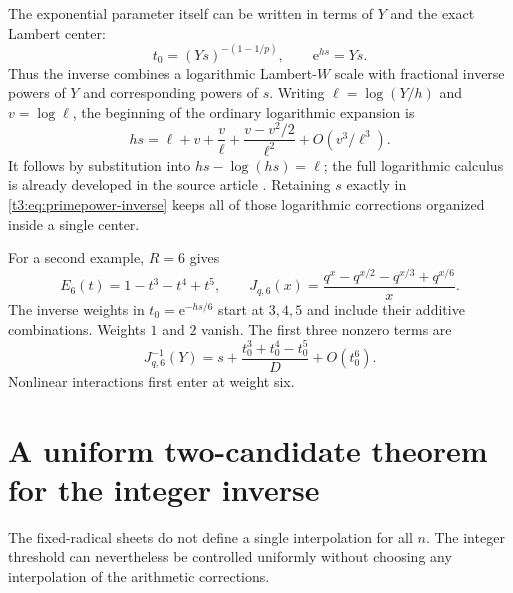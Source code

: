 \documentclass[11pt,openany]{book}
\numberwithin{equation}{chapter}
\theoremstyle{plain}
\theoremstyle{definition}
\theoremstyle{remark}
\newcommand{\ee}{\mathrm e}
\begin{document}
The exponential parameter itself can be written in terms of $Y$ and the exact Lambert center:
\begin{equation}\label{t3:eq:primepower-scale}
 t_0=(Ys)^{-(1-1/p)},\qquad \ee^{hs}=Ys.
\end{equation}
Thus the inverse combines a logarithmic Lambert-$W$ scale with fractional inverse powers of $Y$ and corresponding powers of $s$. Writing
$\ell=\log(Y/h)$ and $v=\log\ell$, the beginning of the ordinary logarithmic expansion is
\begin{equation}\label{t3:eq:W-logexpansion}
 hs=\ell+v+\frac v\ell+\frac{v-v^2/2}{\ell^2}
       +O(v^3/\ell^3).
\end{equation}
It follows by substitution into $hs-\log(hs)=\ell$; the full logarithmic calculus is already developed in the source article \cite{tai}. Retaining $s$ exactly in \eqref{t3:eq:primepower-inverse} keeps all of those logarithmic corrections organized inside a single center.

For a second example, $R=6$ gives
\begin{equation}\label{t3:eq:R6}
 E_6(t)=1-t^3-t^4+t^5,
 \qquad
 J_{q,6}(x)=\frac{q^x-q^{x/2}-q^{x/3}+q^{x/6}}x.
\end{equation}
The inverse weights in $t_0=\ee^{-hs/6}$ start at $3,4,5$ and include their additive combinations. Weights $1$ and $2$ vanish. The first three nonzero terms are
\begin{equation}\label{t3:eq:R6-first}
 J_{q,6}^{-1}(Y)=s+\frac{t_0^3+t_0^4-t_0^5}{D}+O(t_0^6).
\end{equation}
Nonlinear interactions first enter at weight six.

\section{A uniform two-candidate theorem for the integer inverse}

The fixed-radical sheets do not define a single interpolation for all $n$. The integer threshold can nevertheless be controlled uniformly without choosing any interpolation of the arithmetic corrections.
\end{document}
